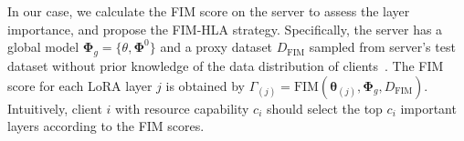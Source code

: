 \documentclass[lettersize,journal]{IEEEtran}
\begin{document}
In our case, we calculate the FIM score on the server to assess the layer importance, and propose the FIM-HLA strategy.
%
%
Specifically, the server has a global model $\boldsymbol{\Phi}_g=\{\boldsymbol{\mathcal{\theta}},\boldsymbol{\Phi}^0\}$ and a proxy dataset $D_{\text{FIM}}$ sampled from server's test dataset without prior knowledge of the data distribution of clients~\cite{cao2020fltrust, park2021sageflow}.
The FIM score for each LoRA layer $j$ is obtained by $ \Gamma_{(j)}=\text{FIM}(\boldsymbol{\theta}_{(j)}, \boldsymbol{\Phi}_g, D_{\text{FIM}})$. Intuitively, client $i$ with resource capability $c_i$ should select the top $c_i$ important layers according to the FIM scores.
\end{document}
